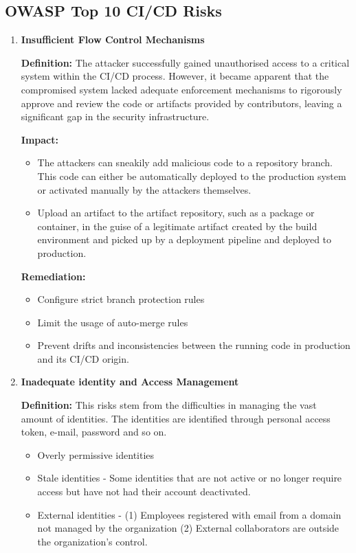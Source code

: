 \subsection{OWASP Top 10 CI/CD Risks\cite{OWASP2023}}
\begin{enumerate}[label=(\arabic*)]
    \item \textbf{Insufficient Flow Control Mechanisms}
    
    \textbf{Definition: }The attacker successfully gained unauthorised access to a critical system within the CI/CD process. 
    However, it became apparent that the compromised system lacked adequate enforcement mechanisms to rigorously 
    approve and review the code or artifacts provided by contributors, leaving a significant gap in the security infrastructure.

    \textbf{Impact: }
        \begin{itemize}
            \item The attackers can sneakily add malicious code to a repository branch. 
            This code can either be automatically deployed to the production system or activated manually by the attackers themselves.
            \item Upload an artifact to the artifact repository, such as a package or container, 
            in the guise of a legitimate artifact created by the build environment and picked 
            up by a deployment pipeline and deployed to production.
        \end{itemize}
    
    \textbf{Remediation:}
    \begin{itemize}
        \item Configure strict branch protection rules
        \item Limit the usage of auto-merge rules
        \item Prevent drifts and inconsistencies between the running code in production and its 
        CI/CD origin.
    \end{itemize}
    \item \textbf{Inadequate identity and Access Management}
    
    \textbf{Definition: }This risks stem from the difficulties in managing the vast amount of
    identities. The identities are identified through personal access token, e-mail, password and so on.
        \begin{itemize}
            \item Overly permissive identities
            \item Stale identities - Some identities that are not active or no longer require access but have
            not had their account deactivated.
            \item External identities - (1) Employees registered with email from a domain not managed by 
            the organization (2) External collaborators are outside the organization's control.
        \end{itemize}


\end{enumerate}
